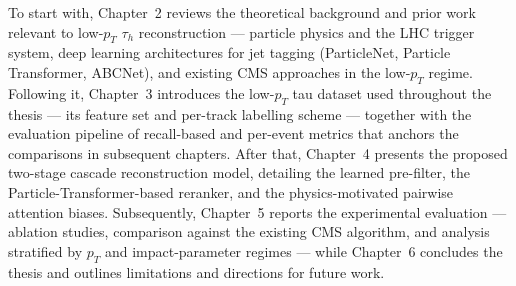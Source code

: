 To start with, Chapter~2 reviews the theoretical background and prior work relevant to low-$p_T$ $\tau_h$ reconstruction — particle physics and the LHC trigger system, deep learning architectures for jet tagging (ParticleNet, Particle Transformer, ABCNet), and existing CMS approaches in the low-$p_T$ regime. Following it, Chapter~3 introduces the low-$p_T$ tau dataset used throughout the thesis — its feature set and per-track labelling scheme — together with the evaluation pipeline of recall-based and per-event metrics that anchors the comparisons in subsequent chapters. After that, Chapter~4 presents the proposed two-stage cascade reconstruction model, detailing the learned pre-filter, the Particle-Transformer-based reranker, and the physics-motivated pairwise attention biases. Subsequently, Chapter~5 reports the experimental evaluation — ablation studies, comparison against the existing CMS algorithm, and analysis stratified by $p_T$ and impact-parameter regimes — while Chapter~6 concludes the thesis and outlines limitations and directions for future work.